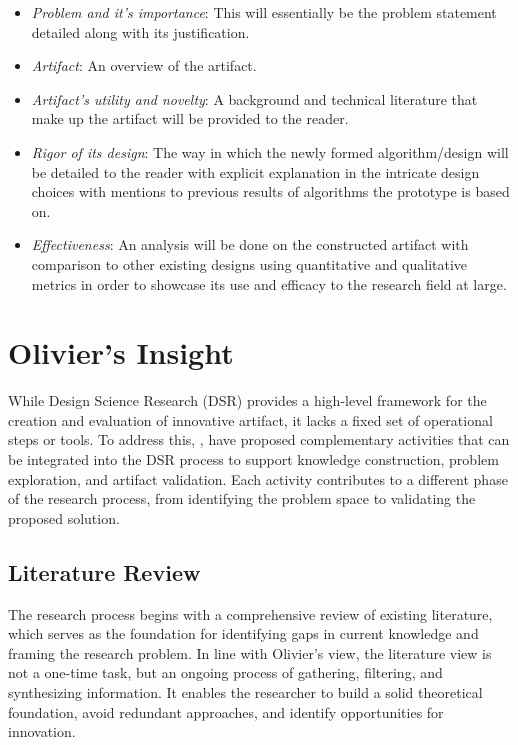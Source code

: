 \begin{enumerate}
\begin{itemize}
        \item \textit{Problem and it's importance}: This will essentially be the problem statement detailed along with its justification.
        \item \textit{Artifact}: An overview of the artifact.
        \item \textit{Artifact's utility and novelty}: A background and technical literature that make up the artifact will be provided to the reader.
        \item \textit{Rigor of its design}: The way in which the newly formed algorithm/design will be detailed to the reader with explicit explanation in the intricate design choices with mentions to previous results of algorithms the prototype is based on.
        \item \textit{Effectiveness}: An analysis will be done on the constructed artifact with comparison to other existing designs using quantitative and qualitative metrics in order to showcase its use and efficacy to the research field at large.
    \end{itemize}
\end{enumerate}

\section{Olivier's Insight}
While Design Science Research (DSR) provides a high-level framework for the creation and evaluation of innovative artifact, it lacks a fixed set of operational steps or tools. To address this, \cite{olivier2009information}, have proposed complementary activities that can be integrated into the DSR process to support knowledge construction, problem exploration, and artifact validation. Each activity contributes to a different phase of the research process, from identifying the problem space to validating the proposed solution.

\subsection{Literature Review}
\noindent The research process begins with a comprehensive review of existing literature, which serves as the foundation for identifying gaps in current knowledge and framing the research problem. In line with Olivier's view, the literature view is not a one-time task, but an ongoing process of gathering, filtering, and synthesizing information. It enables the researcher to build a solid theoretical foundation, avoid redundant approaches, and identify opportunities for innovation.

